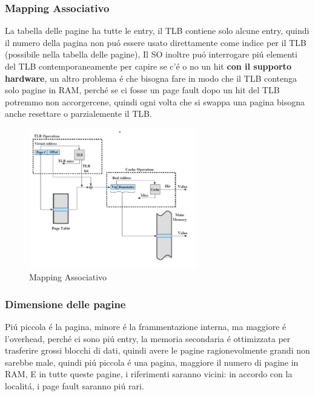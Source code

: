     \subsubsection*{Mapping Associativo}
    La tabella delle pagine ha tutte le entry, il TLB contiene solo alcune entry, quindi il numero della pagina non puó essere
    usato direttamente come indice per il TLB (possibile nella tabella delle pagine), Il SO inoltre puó interrogare piú
    elementi del TLB contemporaneamente per capire se c'é o no un hit \textbf{con il supporto hardware}, un altro
    problema é che bisogna fare in modo che il TLB contenga solo pagine in RAM, perché se ci fosse un page fault dopo
    un hit del TLB potremmo non accorgercene, quindi ogni volta che si swappa una pagina bisogna anche resettare o parzialemente il
    TLB.
    \begin{figure}[H]
        \centering
        \includegraphics[width=0.65\textwidth]{immagini/TLBeCache}
        \caption{Mapping Associativo}
    \end{figure}
    \subsubsection{Dimensione delle pagine}
    Piú piccola é la pagina, minore é la frammentazione interna, ma maggiore é l'overhead, perché ci sono piú entry,
    la memoria secondaria é ottimizzata per trasferire grossi blocchi di dati, quindi avere le pagine ragionevolmente grandi
    non sarebbe male, quindi piú piccola é una pagina, maggiore il numero di pagine in RAM, E in tutte queste pagine, i riferimenti
    saranno vicini: in accordo con la localitá, i page fault saranno piú rari.

